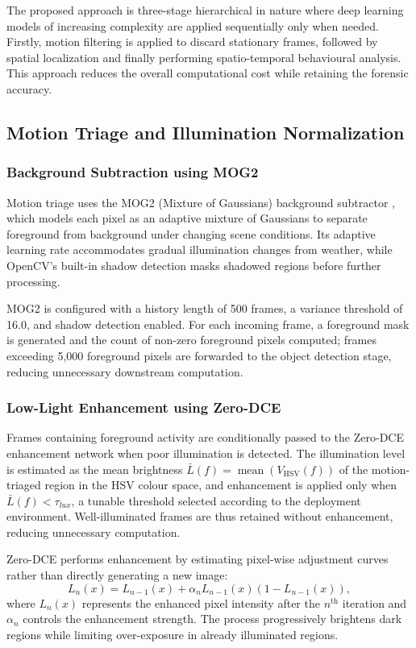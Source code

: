\documentclass[runningheads]{llncs}
\begin{document}
The proposed approach is three-stage hierarchical in nature where deep learning models of increasing complexity are applied sequentially only when needed. Firstly, motion filtering is applied to discard stationary frames, followed by spatial localization and finally performing spatio-temporal behavioural analysis. This approach reduces the overall computational cost while retaining the forensic accuracy.

\subsection{Motion Triage and Illumination Normalization}
\subsubsection{Background Subtraction using MOG2}

Motion triage uses the MOG2 (Mixture of Gaussians) background subtractor \cite{zivkovic2004mog2}, which models each pixel as an adaptive mixture of Gaussians to separate foreground from background under changing scene conditions. Its adaptive learning rate accommodates gradual illumination changes from weather, while OpenCV's built-in shadow detection masks shadowed regions before further processing.

MOG2 is configured with a history length of 500 frames, a variance threshold of 16.0, and shadow detection enabled. For each incoming frame, a foreground mask is generated and the count of non-zero foreground pixels computed; frames exceeding 5,000 foreground pixels are forwarded to the object detection stage, reducing unnecessary downstream computation.

\subsubsection{Low-Light Enhancement using Zero-DCE}
Frames containing foreground activity are conditionally passed to the
Zero-DCE enhancement network \cite{zerodce} when poor illumination is
detected. The illumination level is estimated as the mean brightness
$\bar{L}(f)=\operatorname{mean}\left(V_{\mathrm{HSV}}(f)\right)$ of the
motion-triaged region in the HSV colour space, and enhancement is applied
only when $\bar{L}(f)<\tau_{lux}$, a tunable threshold selected according
to the deployment environment. Well-illuminated frames are thus retained
without enhancement, reducing unnecessary computation.

Zero-DCE performs enhancement by estimating pixel-wise adjustment curves
rather than directly generating a new image:
\begin{equation}
L_n(x)=L_{n-1}(x)+\alpha_nL_{n-1}(x)
\left(1-L_{n-1}(x)\right),
\end{equation}
where $L_n(x)$ represents the enhanced pixel intensity after the
$n^{\text{th}}$ iteration and $\alpha_n$ controls the enhancement strength.
The process progressively brightens dark regions while limiting
over-exposure in already illuminated regions.
\end{document}
